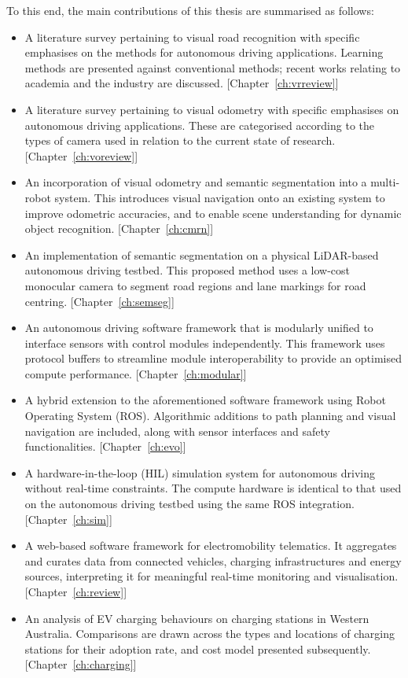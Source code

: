 To this end, the main contributions of this thesis are summarised as follows:
\begin{itemize}
	\item A literature survey pertaining to visual road recognition with specific emphasises on the methods for autonomous driving applications. Learning methods are presented against conventional methods; recent works relating to academia and the industry are discussed. [Chapter~\ref{ch:vrreview}]
	\item A literature survey pertaining to visual odometry with specific emphasises on autonomous driving applications. These are categorised according to the types of camera used in relation to the current state of research. [Chapter~\ref{ch:voreview}]
	\item An incorporation of visual odometry and semantic segmentation into a multi-robot system. This introduces visual navigation onto an existing system to improve odometric accuracies, and to enable scene understanding for dynamic object recognition. [Chapter~\ref{ch:cmrn}]
	\item An implementation of semantic segmentation on a physical LiDAR-based autonomous driving testbed. This proposed method uses a low-cost monocular camera to segment road regions and lane markings for road centring. [Chapter~\ref{ch:semseg}]
	\item An autonomous driving software framework that is modularly unified to interface sensors with control modules independently. This framework uses protocol buffers to streamline module interoperability to provide an optimised compute performance. [Chapter~\ref{ch:modular}]
	\item A hybrid extension to the aforementioned software framework using Robot Operating System (ROS). Algorithmic additions to path planning and visual navigation are included, along with sensor interfaces and safety functionalities. [Chapter~\ref{ch:evo}]
	\item A hardware-in-the-loop (HIL) simulation system for autonomous driving without real-time constraints. The compute hardware is identical to that used on the autonomous driving testbed using the same ROS integration. [Chapter~\ref{ch:sim}]
	\item A web-based software framework for electromobility telematics. It aggregates and curates data from connected vehicles, charging infrastructures and energy sources, interpreting it for meaningful real-time monitoring and visualisation. [Chapter~\ref{ch:review}]
	\item An analysis of EV charging behaviours on charging stations in Western Australia. Comparisons are drawn across the types and locations of charging stations for their adoption rate, and cost model presented subsequently. [Chapter~\ref{ch:charging}]
\end{itemize}

